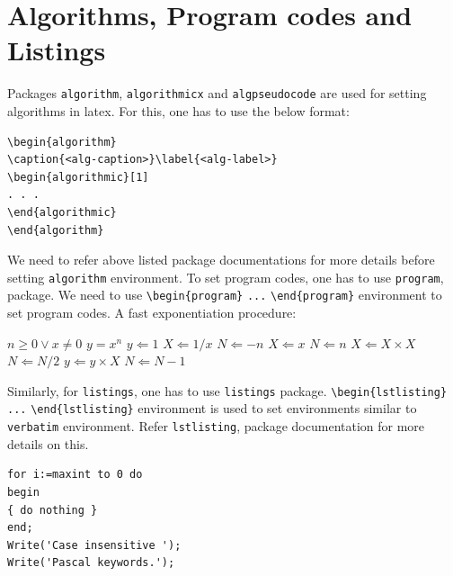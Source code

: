 \documentclass[numbers,webpdf]{ima-authoring-template}%
\theoremstyle{thmstyletwo}%
\numberwithin{equation}{section}
\begin{document}
\section{Algorithms, Program codes and Listings}\label{sec7}

Packages \verb+algorithm+, \verb+algorithmicx+ and \verb+algpseudocode+ are used for setting algorithms in latex.
For this, one has to use the below format:


\begin{verbatim}
\begin{algorithm}
\caption{<alg-caption>}\label{<alg-label>}
\begin{algorithmic}[1]
. . .
\end{algorithmic}
\end{algorithm}
\end{verbatim}


We need to refer above listed package documentations for more details before setting \verb+algorithm+ environment.
To set program codes, one has to use \verb+program+, package. We need to use \verb+\begin{program}+ \verb+...+
\verb+\end{program}+ environment to set program codes. A fast exponentiation procedure:

\begin{algorithm}[!t]
\caption{Calculate $y = x^n$}\label{algo1}
\begin{algorithmic}[1]
\Require $n \geq 0 \vee x \neq 0$
\Ensure $y = x^n$
\State $y \Leftarrow 1$
        \State $X \Leftarrow 1 / x$
        \State $N \Leftarrow -n$
\Else
        \State $X \Leftarrow x$
        \State $N \Leftarrow n$
\EndIf
{}
            \State $X \Leftarrow X \times X$
            \State $N \Leftarrow N / 2$
        \Else[$N$ is odd]
            \State $y \Leftarrow y \times X$
            \State $N \Leftarrow N - 1$
        \EndIf
\EndWhile
\end{algorithmic}
\end{algorithm}

Similarly, for \verb+listings+, one has to use \verb+listings+ package. \verb+\begin{lstlisting}+ \verb+...+ \verb+\end{lstlisting}+ environment is used to set environments similar to \verb+verbatim+ environment. Refer \verb+lstlisting+, package documentation for more details on this.


\begin{minipage}{\hsize}%
\lstset{language=Pascal}%
\begin{lstlisting}[frame=single,framexleftmargin=-1pt,framexrightmargin=-17pt,framesep=12pt,linewidth=0.98\textwidth]
for i:=maxint to 0 do
begin
{ do nothing }
end;
Write('Case insensitive ');
Write('Pascal keywords.');
\end{lstlisting}
\end{minipage}
\end{document}
